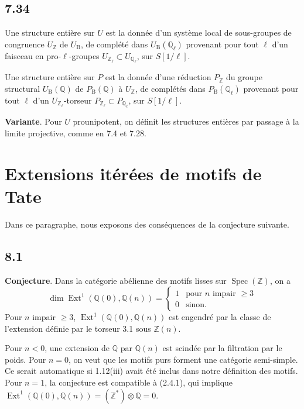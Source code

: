 \documentclass[12pt,a4paper]{article}
\theoremstyle{plain}
\theoremstyle{definition}
\theoremstyle{remark}
\DeclareMathOperator{\Spec}{Spec}
\DeclareMathOperator{\Ext}{Ext}
\newcommand{\B}{\mathrm{B}}
\newcommand{\Z}{\mathbb{Z}}
\newcommand{\Q}{\mathbb{Q}}
\begin{document}
\subsection*{7.34}
Une structure enti\`ere sur $U$ est la donn\'ee d'un syst\`eme local de sous-groupes de congruence $U_\Z$ de $U_\B$, de compl\'et\'e dans $U_\B(\Q_\ell)$ provenant pour tout $\ell$ d'un faisceau en pro-$\ell$-groupes $U_{\Z_\ell} \subset U_{\Q_\ell}$, sur $S[1/\ell]$.

Une structure enti\`ere sur $P$ est la donn\'ee d'une r\'eduction $P_\Z$ du groupe structural $U_\B(\Q)$ de $P_\B(\Q)$ \`a $U_\Z$, de compl\'et\'es dans $P_\B(\Q_\ell)$ provenant pour tout $\ell$ d'un $U_{\Z_\ell}$-torseur $P_{\Z_\ell} \subset P_{\Q_\ell}$, sur $S[1/\ell]$.

\textbf{Variante}. Pour $U$ prounipotent, on d\'efinit les structures enti\`eres par passage \`a la limite projective, comme en 7.4 et 7.28.

\section{Extensions it\'er\'ees de motifs de Tate}
\label{sec:8}

Dans ce paragraphe, nous exposons des cons\'equences de la conjecture suivante.

\subsection*{8.1}
\textbf{Conjecture}. Dans la cat\'egorie ab\'elienne des motifs lisses sur $\Spec(\Z)$, on a
\begin{equation*}\tag{8.1.1}
\dim \Ext^1(\Q(0), \Q(n)) = \begin{cases} 1 & \text{pour $n$ impair $\geq 3$} \\ 0 & \text{sinon.} \end{cases}
\end{equation*}
Pour $n$ impair $\geq 3$, $\Ext^1(\Q(0), \Q(n))$ est engendr\'e par la classe de l'extension d\'efinie par le torseur 3.1 sous $\Z(n)$.

Pour $n < 0$, une extension de $\Q$ par $\Q(n)$ est scind\'ee par la filtration par le poids. Pour $n = 0$, on veut que les motifs purs forment une cat\'egorie semi-simple. Ce serait automatique si 1.12(iii) avait \'et\'e inclus dans notre d\'efinition des motifs. Pour $n = 1$, la conjecture est compatible \`a (2.4.1), qui implique $\Ext^1(\Q(0), \Q(n)) = (\Z^*) \otimes \Q = 0$.
\end{document}
